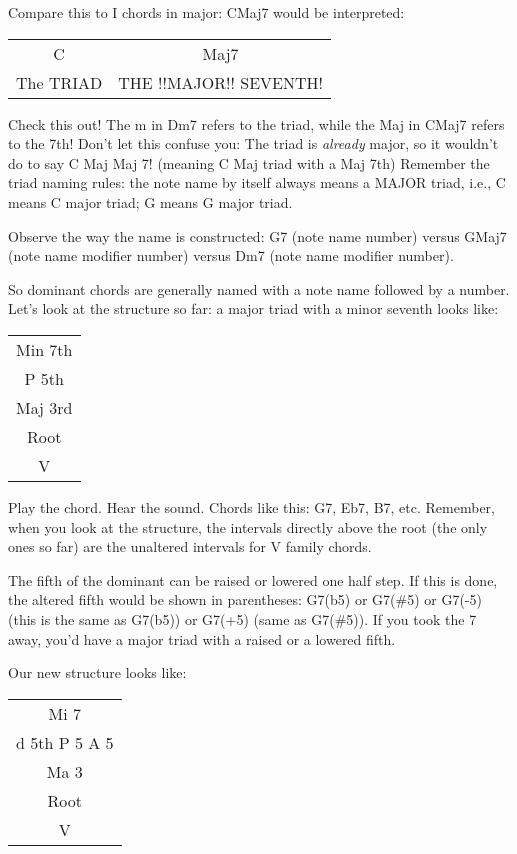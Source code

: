 Compare this to I chords in major: CMaj7 would be interpreted:

\begin{center}
\begin{tabular}{ c c }
  C           & Maj7\\
  The TRIAD   & THE !!MAJOR!! SEVENTH!\\
\end{tabular}
\end{center}

Check this out! The m in Dm7 refers to the triad, while the Maj in CMaj7
refers to the 7th! Don't let this confuse you: The triad is \emph{already} 
major, so it wouldn't do to say C Maj Maj 7! (meaning C Maj triad with
a Maj 7th) Remember the triad naming rules: the note name by itself always
means a MAJOR triad, i.e., C means C major triad; G means G major triad.

Observe the way the name is constructed: G7 (note name   number) versus
GMaj7 (note name  modifier  number) versus Dm7 (note name  modifier  number).

So dominant chords are generally named with a note name followed by a number.
Let's look at the structure so far: a major triad with a minor seventh looks
like:
\begin{center}
\begin{tabular}{ | c | }
  \hline
  Min 7th\\
  P 5th\\
  Maj 3rd\\
  Root\\
  \hline
  V\\
  \hline
\end{tabular}
\end{center}

Play the chord. Hear the sound. Chords like this: G7, Eb7, B7, etc. Remember,
when you look at the structure, the intervals directly above the root (the
only ones so far) are the unaltered intervals for V family chords.

The fifth of the dominant can be raised or lowered one half step. If this is
done, the altered fifth would be shown in parentheses: G7(b5) or G7(\#5) or
G7(-5) (this is the same as G7(b5)) or G7(+5) (same as G7(\#5)). If you took
the 7 away, you'd have a major triad with a raised or a lowered fifth.

Our new structure looks like:

\begin{center}
\begin{tabular}{ | c | }
  \hline
  Mi 7\\
  d 5th   P 5   A 5\\
  Ma 3\\
  Root\\
  \hline
  V\\
  \hline
\end{tabular}
\end{center}


